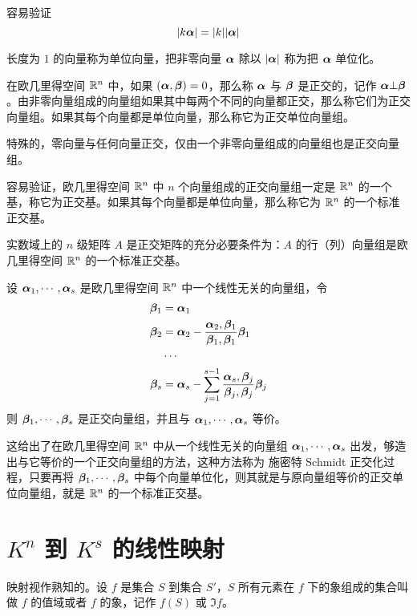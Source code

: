 容易验证
$$|k\boldsymbol{\alpha}| = |k||\boldsymbol{\alpha}|$$

长度为 $1$ 的向量称为单位向量，把非零向量 $\boldsymbol{\alpha}$ 除以 $|\boldsymbol{\alpha}|$ 称为把 $\boldsymbol{\alpha}$ 单位化。

在欧几里得空间 $\mathbb{R}^n$ 中，如果 $(\boldsymbol{\alpha},\boldsymbol{\beta})=0$，那么称 $\boldsymbol{\alpha}$ 与 $\boldsymbol{\beta}$ 是正交的，记作 $\boldsymbol{\alpha} \bot \boldsymbol{\beta}$。由非零向量组成的向量组如果其中每两个不同的向量都正交，那么称它们为正交向量组。如果其每个向量都是单位向量，那么称它为正交单位向量组。

特殊的，零向量与任何向量正交，仅由一个非零向量组成的向量组也是正交向量组。

容易验证，欧几里得空间 $\mathbb{R}^n$ 中 $n$ 个向量组成的正交向量组一定是 $\mathbb{R}^n$ 的一个基，称它为正交基。如果其每个向量都是单位向量，那么称它为 $\mathbb{R}^n$ 的一个标准正交基。

\begin{theorem}
    实数域上的 $n$ 级矩阵 $A$ 是正交矩阵的充分必要条件为：$A$ 的行（列）向量组是欧几里得空间 $\mathbb{R}^n$ 的一个标准正交基。
\end{theorem}

\begin{theorem}
    设 $\boldsymbol{\alpha}_1,\cdots,\boldsymbol{\alpha}_s$ 是欧几里得空间 $\mathbb{R}^n$ 中一个线性无关的向量组，令
    \begin{equation*}
        \begin{aligned}
            \boldsymbol{\beta}_1&=\boldsymbol{\alpha}_1\\
            \boldsymbol{\beta}_2&=\boldsymbol{\alpha}_2 - \frac{\boldsymbol{\alpha}_2,\boldsymbol{\beta}_1}{\boldsymbol{\beta}_1,\boldsymbol{\beta}_1}\boldsymbol{\beta}_1\\
            &\cdots \\
            \boldsymbol{\beta}_s &= \boldsymbol{\alpha}_s-\sum_{j=1}^{s-1}\frac{\boldsymbol{\alpha}_s,\boldsymbol{\beta}_j}{\boldsymbol{\beta}_j,\boldsymbol{\beta}_j}\boldsymbol{\beta}_j
        \end{aligned}
    \end{equation*}
    则 $\boldsymbol{\beta}_1,\cdots,\boldsymbol{\beta}_s$ 是正交向量组，并且与 $\boldsymbol{\alpha}_1,\cdots,\boldsymbol{\alpha}_s$ 等价。
\end{theorem}

这给出了在欧几里得空间 $\mathbb{R}^n$ 中从一个线性无关的向量组 $\boldsymbol{\alpha}_1,\cdots,\boldsymbol{\alpha}_s$ 出发，够造出与它等价的一个正交向量组的方法，这种方法称为 施密特 Schmidt 正交化过程，只要再将 $\boldsymbol{\beta}_1,\cdots,\boldsymbol{\beta}_s$ 中每个向量单位化，则其就是与原向量组等价的正交单位向量组，就是 $\mathbb{R}^n$ 的一个标准正交基。

\section{\texorpdfstring{$K^n$ 到 $K^s$ 的线性映射}{Kn 到 Ks 的线性映射}}

映射视作熟知的。设 $f$ 是集合 $S$ 到集合 $S'$，$S$ 所有元素在 $f$ 下的象组成的集合叫做 $f$ 的值域或者 $f$ 的象，记作 $f(S)$ 或 $\Im f$。

